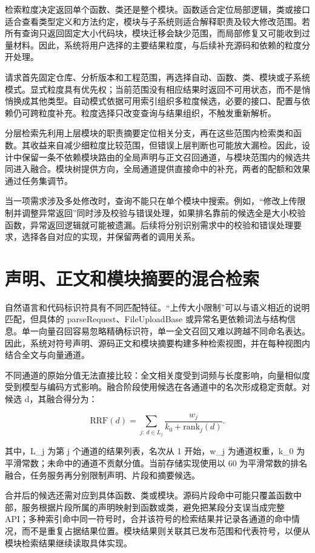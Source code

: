 检索粒度决定返回单个函数、类还是整个模块。函数适合定位局部逻辑，类或接口适合查看类型定义和方法约定，模块与子系统则适合解释职责及较大修改范围。若所有查询只返回固定大小代码块，模块迁移会缺少范围，而局部修复又可能收到过量材料。因此，系统将用户选择的主要结果粒度，与后续补充源码和依赖的粒度分开处理。

请求首先固定仓库、分析版本和工程范围，再选择自动、函数、类、模块或子系统模式。显式粒度具有优先权；当前范围没有相应结果时返回不可用状态，而不是悄悄换成其他类型。自动模式依据可用索引组织多粒度候选，必要的接口、配置与依赖仍可跨粒度补充。粒度选择只改变查询与结果组织，不触发重新解析。

分层检索先利用上层模块的职责摘要定位相关分支，再在这些范围内检索类和函数。其收益来自减少细粒度比较范围，但错误上层判断也可能放大漏检。因此，设计中保留一条不依赖模块路由的全局声明与正文召回通道，与模块范围内的候选共同进入融合。模块树提供方向，全局通道提供直接命中的补充，两者的配额和效果通过任务集调节。

当一项需求涉及多处修改时，查询不能只在单个模块中搜索。例如，“修改上传限制并调整异常返回”同时涉及校验与错误处理，如果排名靠前的候选全是大小校验函数，异常返回逻辑就可能被遗漏。后续将分别识别需求中的校验和错误处理要求，选择各自对应的实现，并保留两者的调用关系。

\section{声明、正文和模块摘要的混合检索}

自然语言和代码标识符具有不同匹配特征。“上传大小限制”可以与语义相近的说明匹配，但具体的 parseRequest、FileUploadBase 或异常名更依赖词法与结构信息。单一向量召回容易忽略精确标识符，单一全文召回又难以跨越不同命名表达。因此，系统对符号声明、源码正文和模块摘要构建多种检索视图，并在每种视图内结合全文与向量通道。

不同通道的原始分值无法直接比较：全文相关度受到词频与长度影响，向量相似度受到模型与编码方式影响。融合阶段使用候选在各通道中的名次形成稳定贡献。对候选 d，其融合得分为：

\begin{equation}
\mathrm{RRF}(d)=\sum_{j:\ d\in L_j}\frac{w_j}{k_0+\mathrm{rank}_j(d)}.
\end{equation}

其中，L\_j 为第 j 个通道的结果列表，名次从 1 开始，w\_j 为通道权重，k\_0 为平滑常数；未命中的通道不贡献分值。当前存储实现使用以 60 为平滑常数的排名融合，任务服务再分别限制声明、片段和摘要候选。

合并后的候选还需对应到具体函数、类或模块。源码片段命中可能只覆盖函数中部，服务根据片段所属的声明映射到函数或类，避免把某段分支误当成完整 API；多种索引命中同一符号时，合并该符号的检索结果并记录各通道的命中情况，而不是重复占据结果位置。模块结果则关联其已发布范围和代表符号，以便从模块检索结果继续读取具体实现。

